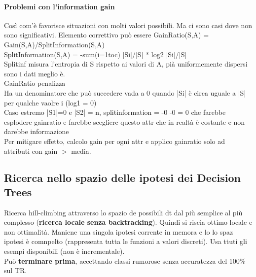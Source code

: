 \documentclass[10pt]{book}
\begin{document}
\paragraph{Problemi con l'information gain} Così com'è favorisce situazioni con molti valori possibili. Ma ci sono casi dove non sono significativi. %
Elemento correttivo può essere GainRatio(S,A) = Gain(S,A)/SplitInformation(S,A)\\
SplitInformation(S,A) = -sum(i=1toc) |Si|/|S| * log2 |Si|/|S|\\
Splitinf misura l'entropia di S rispetto ai valori di A, pià uniformemente dispersi sono i dati meglio è.\\
GainRatio penalizza\\ %
Ha un denominatore che può succedere vada a 0 quando |Si| è circa uguale a |S| per qualche vaolre i (log1 = 0)\\
Caso estremo |S1|=0 e |S2| = n, splitinformation = -0 -0 = 0 che farebbe esplodere gainratio e farebbe scegliere questo attr che in realtà è costante e non darebbe informazione\\
Per mitigare effetto, calcolo gain per ogni attr e applico gainratio solo ad attributi con gain $>$ media.
\subsection{Ricerca nello spazio delle ipotesi dei Decision Trees}
Ricerca hill-climbing attraverso lo spazio de possibili dt dal più semplice al più complesso (\textbf{ricerca locale senza backtracking}). Quindi si riscia ottimo locale e non ottimalità. Maniene una singola ipotesi corrente in memora e lo lo spaz ipotesi è comnpelto (rappresenta tutta le funzioni a valori discreti). Usa ttuti gli esempi disponibili (non è incrementale).\\
Può \textbf{terminare prima}, accettando classi rumorose senza accuratezza del 100\% sul TR.
\end{document}
